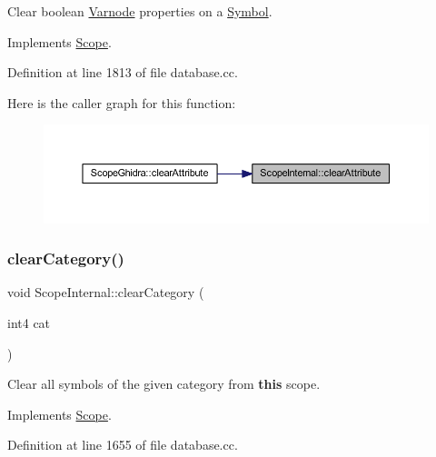 Clear boolean \mbox{\hyperlink{class_varnode}{Varnode}} properties on a \mbox{\hyperlink{class_symbol}{Symbol}}. 



Implements \mbox{\hyperlink{class_scope_afb57165fd0d3c182e18ea24e7231975d}{Scope}}.



Definition at line 1813 of file database.\+cc.

Here is the caller graph for this function\+:
\nopagebreak
\begin{figure}[H]
\begin{center}
\leavevmode
\includegraphics[width=350pt]{class_scope_internal_a8c42cfc4ea5d359bd11d1251ef8d21d7_icgraph}
\end{center}
\end{figure}
\mbox{\label{class_scope_internal_a4139d0dd5d98849bd42291246cdb2f9a}} 
\subsubsection{\texorpdfstring{clearCategory()}{clearCategory()}}
{\footnotesize\ttfamily void Scope\+Internal\+::clear\+Category (\begin{DoxyParamCaption}\item[{int4}]{cat }\end{DoxyParamCaption})\hspace{0.3cm}{\ttfamily [virtual]}}



Clear all symbols of the given category from {\bfseries{this}} scope. 



Implements \mbox{\hyperlink{class_scope_ab3c8275b6500a9cc620cc31f32ed267e}{Scope}}.



Definition at line 1655 of file database.\+cc.

